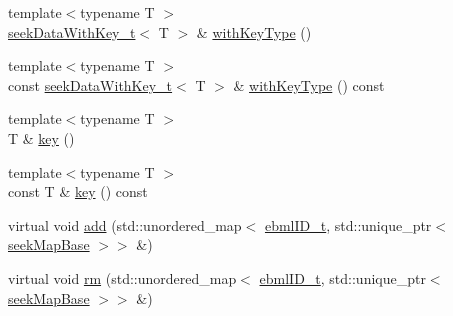 \begin{DoxyCompactItemize}
{\footnotesize template$<$typename T $>$ }\\\mbox{\hyperlink{classebml_1_1seekDataWithKey__t}{seek\+Data\+With\+Key\+\_\+t}}$<$ T $>$ \& \mbox{\hyperlink{classebml_1_1seekData__t_a1c5d23645387f0d93a078d2227893b50}{with\+Key\+Type}} ()
\item 
{\footnotesize template$<$typename T $>$ }\\const \mbox{\hyperlink{classebml_1_1seekDataWithKey__t}{seek\+Data\+With\+Key\+\_\+t}}$<$ T $>$ \& \mbox{\hyperlink{classebml_1_1seekData__t_aea1960bbf31310cf899420a7a36d5a49}{with\+Key\+Type}} () const
\item 
{\footnotesize template$<$typename T $>$ }\\T \& \mbox{\hyperlink{classebml_1_1seekData__t_a1dec5e33c576eecc5685796c28dca712}{key}} ()
\item 
{\footnotesize template$<$typename T $>$ }\\const T \& \mbox{\hyperlink{classebml_1_1seekData__t_a9a3356fbd22caa75a6df703e3e2f2ca6}{key}} () const
\item 
virtual void \mbox{\hyperlink{classebml_1_1seekData__t_a6ca62e902490d42a3dd03cfd23452016}{add}} (std\+::unordered\+\_\+map$<$ \mbox{\hyperlink{namespaceebml_a86c5f604ddf12a74aa9812e997a58691}{ebml\+I\+D\+\_\+t}}, std\+::unique\+\_\+ptr$<$ \mbox{\hyperlink{classebml_1_1seekMapBase}{seek\+Map\+Base}} $>$$>$ \&)
\item 
virtual void \mbox{\hyperlink{classebml_1_1seekData__t_a1f0da8c547bc52496bc4716ec732d138}{rm}} (std\+::unordered\+\_\+map$<$ \mbox{\hyperlink{namespaceebml_a86c5f604ddf12a74aa9812e997a58691}{ebml\+I\+D\+\_\+t}}, std\+::unique\+\_\+ptr$<$ \mbox{\hyperlink{classebml_1_1seekMapBase}{seek\+Map\+Base}} $>$$>$ \&)
\end{DoxyCompactItemize}
